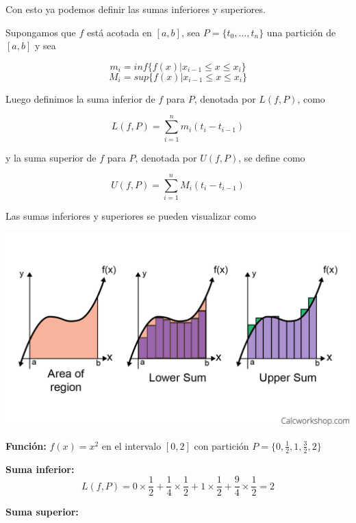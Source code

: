 \documentclass{report}
\begin{document}
    Con esto ya podemos definir las sumas inferiores y superiores.

    \begin{defBox}
        Supongamos que $f$ está acotada en $[a,b]$, sea $P = \{t_0,\dots,t_n\}$ una partición de $[a,b]$ y sea

        $$m_i = inf\{f(x) | x_{i-1} \leq x \leq x_i\}$$
        $$M_i = sup\{f(x) | x_{i-1} \leq x \leq x_i\}$$

        Luego definimos la suma inferior de $f$ para $P$, denotada por $L(f, P)$, como

        $$L(f, P) = \sum_{i=1}^{n}m_i(t_{i} - t_{i-1})$$

        y la suma superior de $f$ para $P$, denotada por $U(f, P)$, se define como

        $$U(f, P) = \sum_{i=1}^{n}M_i(t_{i} - t_{i-1})$$
    \end{defBox}

    Las sumas inferiores y superiores se pueden visualizar como

    \begin{Figure}
        \begin{center}
        \includegraphics[width=1\textwidth]{images/lowerupper.png}
        \end{center}
    \end{Figure}

    \textbf{Función:} \( f(x) = x^2 \) en el intervalo \( [0, 2] \) con partición \( P = \{0, \frac{1}{2}, 1, \frac{3}{2}, 2\} \)

    \textbf{Suma inferior:}
    \[
    L(f, P) = 0 \times \frac{1}{2} + \frac{1}{4} \times \frac{1}{2} + 1 \times \frac{1}{2} + \frac{9}{4} \times \frac{1}{2} = 2
    \]

    \textbf{Suma superior:}
\end{document}
